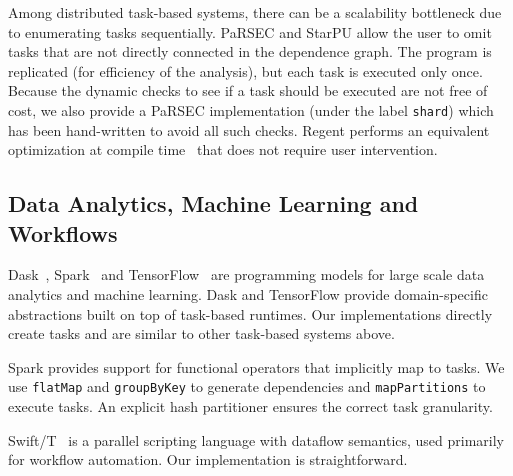 Among distributed task-based systems, there can be a scalability
bottleneck due to enumerating tasks sequentially. PaRSEC and StarPU
allow the user to omit tasks that are not
directly connected in the dependence graph. The program is replicated
(for efficiency of the analysis), but each task is executed only
once. Because the dynamic checks to see if a task should be executed
are not free of cost, we also provide a PaRSEC implementation (under
the label \lstinline{shard}) which has been hand-written to avoid all
such checks. Regent performs an equivalent optimization at compile
time~\cite{ControlReplication17} that does not require user
intervention.

\subsection{Data Analytics, Machine Learning and Workflows}

Dask~\cite{Dask15}, Spark~\cite{Spark10} and
TensorFlow~\cite{TensorFlow15} are programming models for large scale
data analytics and machine learning. Dask and TensorFlow provide
domain-specific abstractions built on top of task-based runtimes. Our
implementations directly create tasks and are similar to other
task-based systems above.

Spark provides support for functional operators that implicitly map to
tasks. We use \lstinline[language=Scala]{flatMap} and
\lstinline[language=Scala]{groupByKey} to generate dependencies and
\lstinline[language=Scala]{mapPartitions} to execute tasks. An
explicit hash partitioner ensures the correct task granularity.

Swift/T~\cite{Wozniak13} is a parallel scripting language
with dataflow semantics, used primarily for workflow automation. Our
implementation is straightforward.
